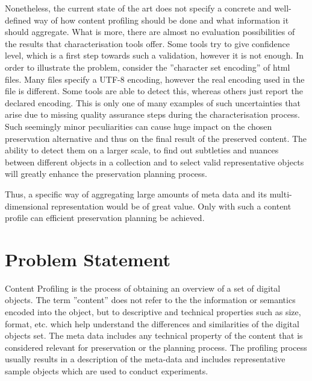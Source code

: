 Nonetheless, the current state of the art does not specify a concrete and well-defined way of how content profiling should be done and what information it should aggregate. What is more, there are almost no evaluation possibilities of the results that characterisation tools offer. Some tools try to give confidence level, which is a first step towards such a validation, however it is not enough. In order to illustrate the problem, consider the ''character set encoding'' of html files. Many files specify a UTF-8 encoding, however the real encoding used in the file is different. Some tools are able to detect this, whereas others just report the declared encoding. This is only one of many examples of such uncertainties that arise due to missing quality assurance steps during the characterisation process. Such seemingly minor peculiarities can cause huge impact on the chosen preservation alternative and thus on the final result of the preserved content. The ability to detect them on a larger scale, to find out subtleties and nuances between different objects in a collection and to select valid representative objects will greatly enhance the preservation planning process.

Thus, a specific way of aggregating large amounts of meta data and its multi-dimensional representation would be of great value. Only with such a content profile can efficient preservation planning be achieved.

\section{Problem Statement}
\label{sec:problem_statement}
Content Profiling is the process of obtaining an overview of a set of digital objects.
The term ''content'' does not refer to the the information or semantics encoded into the object, but to descriptive and technical properties such as size, format, etc. which help understand the differences and similarities of the digital objects set.
The meta data includes any technical property of the content that is considered relevant for preservation or the planning process.
The profiling process usually results in a description of the meta-data and includes representative sample objects which are used to conduct experiments.

